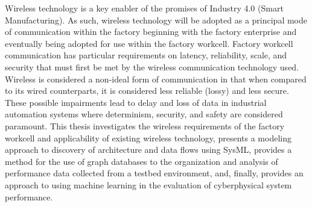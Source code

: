 Wireless technology is a key enabler of the promises of Industry 4.0 (Smart Manufacturing). As such, wireless technology will be adopted as a principal mode of communication within the factory beginning with the factory enterprise and eventually being adopted for use within the factory workcell.  Factory workcell communication has particular requirements on latency, reliability, scale, and security that must first be met by the wireless communication technology used.  Wireless is considered a non-ideal form of communication in that when compared to its wired counterparts, it is considered less reliable (lossy) and less secure.  These possible impairments lead to delay and loss of data in industrial automation systems where determinism, security, and safety are considered paramount.  This thesis investigates the wireless requirements of the factory workcell and applicability of existing wireless technology, presents a modeling approach to discovery of architecture and data flows using SysML, provides a method for the use of graph databases to the organization and analysis of performance data collected from a testbed environment, and, finally, provides an approach to using machine learning in the evaluation of cyberphysical system performance.